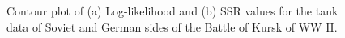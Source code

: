 \documentclass[]{article}
\begin{document}
\begin{figure}
\centering
{}\hspace{5pt}
\caption{Contour plot of (a) Log-likelihood and (b) SSR values for the tank data of Soviet and German sides of the Battle of Kursk of WW II. 
} 
\end{figure}
\end{document}
